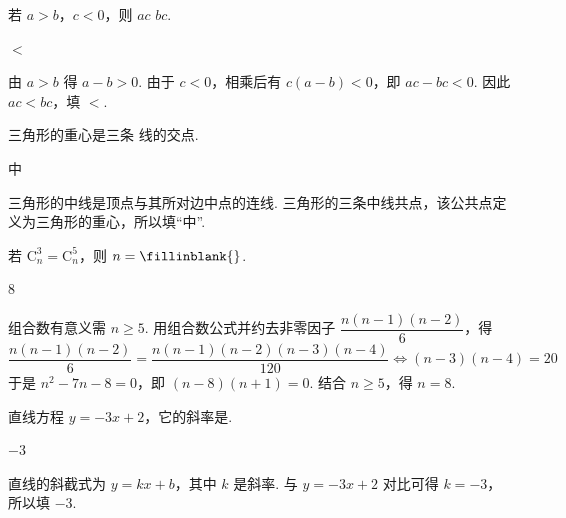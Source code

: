 \begin{problem}
若 \(a>b\)，\(c<0\)，则 \(ac\)\fillinblank{} \(bc\).
\end{problem}

\begin{answer}
\(<\)
\end{answer}

\begin{solution}
由 \(a>b\) 得 \(a-b>0\). 由于 \(c<0\)，相乘后有 \(c(a-b)<0\)，即 \(ac-bc<0\). 因此 \(ac<bc\)，填 \(<\).
\end{solution}

\begin{problem}
三角形的重心是三条\fillinblank{} 线的交点.
\end{problem}

\begin{answer}
中
\end{answer}

\begin{solution}
三角形的中线是顶点与其所对边中点的连线. 三角形的三条中线共点，该公共点定义为三角形的重心，所以填“中”.
\end{solution}

\begin{problem}
若 \(\mathrm C_n^3=\mathrm C_n^5\)，则 \(n=\fillinblank{}\).
\end{problem}

\begin{answer}
\(8\)
\end{answer}

\begin{solution}
组合数有意义需 \(n\geqslant5\). 用组合数公式并约去非零因子 \(\dfrac{n(n-1)(n-2)}{6}\)，得
\[
\frac{n(n-1)(n-2)}{6}=\frac{n(n-1)(n-2)(n-3)(n-4)}{120}
\Longleftrightarrow (n-3)(n-4)=20
\]
于是 \(n^2-7n-8=0\)，即 \((n-8)(n+1)=0\). 结合 \(n\geqslant5\)，得 \(n=8\).
\end{solution}

\begin{problem}
直线方程 \(y=-3x+2\)，它的斜率是\fillinblank{}.
\end{problem}

\begin{answer}
\(-3\)
\end{answer}

\begin{solution}
直线的斜截式为 \(y=kx+b\)，其中 \(k\) 是斜率. 与 \(y=-3x+2\) 对比可得 \(k=-3\)，所以填 \(-3\).
\end{solution}

